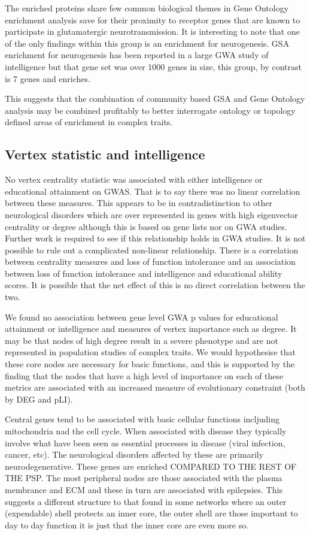 The enriched proteins share few common biological themes in Gene Ontology enrichment analysis save for their proximity to receptor genes that are known to participate in glutamatergic neurotransmission. It is interesting to note that one of the only findings within this group is an enrichment for neurogenesis. GSA enrichment for neurogenesis has been reported in a large GWA study of intelligence\cite{hill2019combined} but that gene set was over 1000 genes in size, this group, by contrast is 7 genes and enriches. 

This suggests that the combination of community based GSA and Gene Ontology analysis may be combined profitably to better interrogate ontology or topology defined areas of enrichment in complex traits. 


\subsection{Vertex statistic and intelligence}

No vertex centrality statistic was associated with either intelligence or educational attainment on GWAS. That is to say there was no linear correlation between these measures. This appears to be in contradistinction to other neurological disorders which are over represented in genes with high eigenvector centrality or degree although this is based on gene lists nor on GWA studies. Further work is required to see if this relationship holds in GWA studies. It is not possible to rule out a complicated non-linear relationship. There is a correlation between centrality measures and loss of function intolerance and an association between loss of function intolerance and intelligence and educational ability scores. It is possible that the net effect of this is no direct correlation between the two. 

We found no association between gene level GWA p values for educational attainment or intelligence and measures of vertex importance such as degree. It may be that nodes of high degree result in a severe phenotype and are not represented in population studies of complex traits. We would hypothesise that these core nodes are necessary for basic functions, and this is supported by the finding that the nodes that have a high level of importance on each of these metrics are associated with an increased measure of evolutionary constraint (both by DEG and pLI). 


Central genes tend to be associated with basic cellular functions incljuding mitochondria nad the cell cycle. When associated with disease they typically involve what have been seen as essential processes in disease (viral infection, cancer, etc). The neurological disorders affected by these are primarily neurodegenerative. These genes are enriched COMPARED TO THE REST OF THE PSP. The most peripheral nodes are those associated with the plasma membrance and ECM and these in turn are associated with epilepsies. This suggests a different structure to that found in some networks where an outer (expendable) shell protects an inner core, the outer shell are those important to day to day function it is just that the inner core are even more so. 

